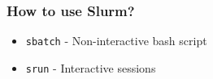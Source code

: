 \documentclass{beamer}
\newcommand{\code}[1]{\colorbox{codegray}{\texttt{#1}}}
\begin{document}



%

\begin{frame}
\frametitle{How to use Slurm?}
\begin{itemize}
    \item \code{sbatch} - Non-interactive bash script
    \bigskip
    \pause
    \item \code{srun} - Interactive sessions 
    \bigskip
\end{itemize}
\end{frame}
\end{document}
